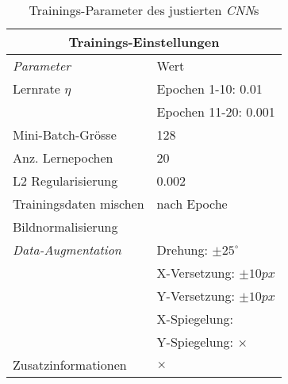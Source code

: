\begin{table}[!htb]
	\def\arraystretch{1.2}
	\centering
	\begin{subtable}[t]{.5\linewidth}
		\begin{tabular}[t]{l | l }
			\multicolumn{2}{c}{\textbf{Trainings-Einstellungen}}\\
			\hline
			\textit{Parameter} & Wert\\
			\hline
			\hline
			Lernrate $\eta$ & Epochen 1-10: 0.01\\
					        & Epochen 11-20: 0.001\\
			Mini-Batch-Grösse & 128\\
			Anz. Lernepochen & 20\\
			L2 Regularisierung & 0.002\\
			Trainingsdaten mischen& nach Epoche\\
			Bildnormalisierung & \checkmark\\
			\textit{Data-Augmentation}& Drehung: $\pm25^{\circ}$ \\
			& X-Versetzung: $\pm10px$ \\
			& Y-Versetzung: $\pm10px$ \\
			& X-Spiegelung: \checkmark \\
			& Y-Spiegelung: $\times$ \\
			Zusatzinformationen &  $\times$ \\
		\end{tabular}
	\end{subtable} 
	\caption{Trainings-Parameter des justierten \textit{CNN}s}
	\label{table:final_cnn_training}
\end{table}

